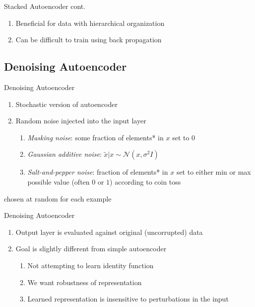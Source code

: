 \documentclass[pdf]{beamer}
\begin{document}
		\begin{frame} {Stacked Autoencoder cont.}
		\begin{enumerate}
			\item Beneficial for data with hierarchical organization
			\item Can be difficult to train using back propagation 
		\end{enumerate}
		\end{frame}


\subsection{Denoising Autoencoder}
			\begin{frame}{Denoising Autoencoder}
			\begin{enumerate}
				\item Stochastic version of autoencoder
				\item Random noise injected into the input layer
				\begin{enumerate}[1]
					\item \textit{Masking noise}: some fraction of elements* in $x$ set to $0$ 
					\item \textit{Gaussian additive noise}: $\tilde{x}|x \sim \mathcal{N}(x, \sigma^2I) $
					\item \textit{Salt-and-pepper noise}: fraction of elements* in $x$ set to either min or max possible value (often $0$ or $1$) according to coin toss
				\end{enumerate}
			\end{enumerate}
			\vspace{5em}
			\hspace{2em} {\tiny * chosen at random for each example}
			\end{frame}
			
	
			
			\begin{frame}{Denoising Autoencoder}
			\begin{enumerate}
				\item Output layer is evaluated against original (uncorrupted) data
				\item Goal is slightly different from simple autoencoder
				\begin{enumerate}[1]
					\item Not attempting to learn identity function
					\item We want robustness of representation
					\item Learned representation is insensitive to perturbations in the input
				\end{enumerate}
			\end{enumerate}
			\end{frame}
			
\end{document}
